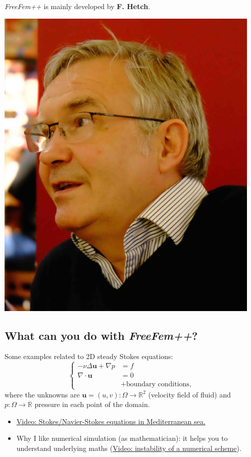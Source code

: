 \documentclass[12pt]{article}
\newcommand{\FF}{\textit{FreeFem++}\xspace}
\newcommand{\R}{{\mathbb R}}
\begin{document}
\FF is mainly developed by \textbf{F. Hetch}.
\begin{center}
  \includegraphics[width=0.3\linewidth]{./Hecht-portrait}
\end{center}

\subsection{What can you do with \FF?}
Some examples related to 2D steady Stokes equations:
\begin{equation*}
  \left\{
  \begin{aligned}
    -\nu\Delta \mathbf{u}+ \nabla p &= f
    \\
    \nabla\cdot \mathbf{u} & = 0
    \\ & + \text{boundary conditions},
  \end{aligned}
  \right.
\end{equation*}
where the unknowns are $\mathbf{u}=(u,v):\Omega\to\R^2$ (velocity field of fluid)
and $p:\Omega\to\R$ pressure in each point of the domain.
\begin{itemize}
\item
  \href{https://www.youtube.com/watch?v=dn4UeMQDf9c&index=2&list=UUbv6VZ2UBw4iXCMR2L4G0zg&t=0s}{Video:
    Stokes/Navier-Stokes equations in Mediterranean sea.}
\item Why I like numerical simulation (as mathematician): it helps you
  to understand underlying maths
  (\href{https://www.youtube.com/watch?v=6x8KseewSrU&feature=youtu.be}{Video:
    instability of a numerical scheme}).
\end{itemize}
\end{document}
